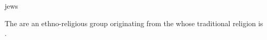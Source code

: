 \documentclass{stex}
\begin{document}
\begin{smodule}{jews}
\begin{sparagraph}[style=symdoc]
The  are an ethno-religious group originating from the
 whose traditional religion is .
\end{sparagraph}
\end{smodule}
\end{document}
